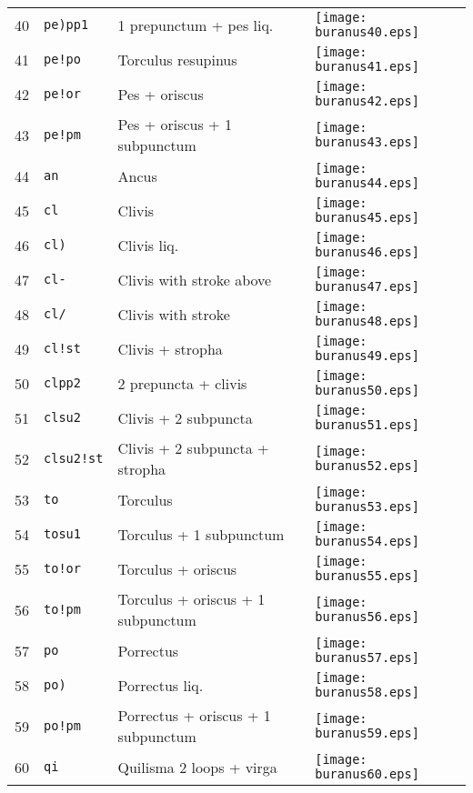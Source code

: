 \documentclass{scrarticle}
\begin{document}
\begin{longtable}{l|l|l|l}
40 & \texttt{pe)pp1} & 1 prepunctum + pes liq. & \texttt{[image: buranus40.eps]} \\
41 & \texttt{pe!po} & Torculus resupinus & \texttt{[image: buranus41.eps]} \\
42 & \texttt{pe!or} & Pes + oriscus & \texttt{[image: buranus42.eps]} \\
43 & \texttt{pe!pm} & Pes + oriscus + 1 subpunctum & \texttt{[image: buranus43.eps]} \\
44 & \texttt{an} & Ancus & \texttt{[image: buranus44.eps]} \\
45 & \texttt{cl} & Clivis & \texttt{[image: buranus45.eps]} \\
46 & \texttt{cl)} & Clivis liq. & \texttt{[image: buranus46.eps]} \\
47 & \texttt{cl-} & Clivis with stroke above & \texttt{[image: buranus47.eps]} \\
48 & \texttt{cl/} & Clivis with stroke & \texttt{[image: buranus48.eps]} \\
49 & \texttt{cl!st} & Clivis + stropha & \texttt{[image: buranus49.eps]} \\
50 & \texttt{clpp2} & 2 prepuncta + clivis & \texttt{[image: buranus50.eps]} \\
51 & \texttt{clsu2} & Clivis + 2 subpuncta & \texttt{[image: buranus51.eps]} \\
52 & \texttt{clsu2!st} & Clivis + 2 subpuncta + stropha & \texttt{[image: buranus52.eps]} \\
53 & \texttt{to} & Torculus & \texttt{[image: buranus53.eps]} \\
54 & \texttt{tosu1} & Torculus + 1 subpunctum & \texttt{[image: buranus54.eps]} \\
55 & \texttt{to!or} & Torculus + oriscus & \texttt{[image: buranus55.eps]} \\
56 & \texttt{to!pm} & Torculus + oriscus + 1 subpunctum & \texttt{[image: buranus56.eps]} \\
57 & \texttt{po} & Porrectus & \texttt{[image: buranus57.eps]} \\
58 & \texttt{po)} & Porrectus liq. & \texttt{[image: buranus58.eps]} \\
59 & \texttt{po!pm} & Porrectus + oriscus + 1 subpunctum & \texttt{[image: buranus59.eps]} \\
60 & \texttt{qi} & Quilisma 2 loops + virga & \texttt{[image: buranus60.eps]} \\

\end{longtable}
\end{document}
